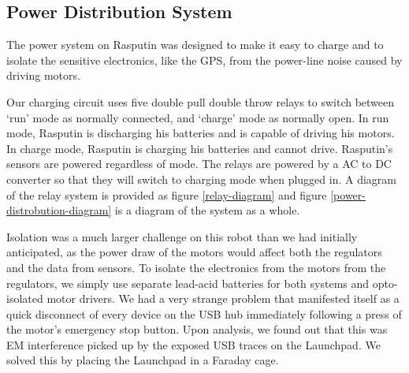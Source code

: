 \documentclass[master.tex]{subfiles}
\begin{document}

\subsection{Power Distribution System}
The power system on Rasputin was designed to make it easy to charge and to isolate the sensitive electronics, like the GPS, from the power-line noise caused by driving motors.

Our charging circuit uses five double pull double throw relays to switch between `run' mode as normally connected, and `charge' mode as normally open.
In run mode, Rasputin is discharging his batteries and is capable of driving his motors.
In charge mode, Rasputin is charging his batteries and cannot drive.
Rasputin's sensors are powered regardless of mode.
The relays are powered by a AC to DC converter so that they will switch to charging mode when plugged in.
A diagram of the relay system is provided as figure \ref{relay-diagram} and figure \ref{power-distrobution-diagram} is a diagram of the system as a whole.


Isolation was a much larger challenge on this robot than we had initially anticipated, as the power draw of the motors would affect both the regulators and the data from sensors.
To isolate the electronics from the motors from the regulators, we simply use separate lead-acid batteries for both systems and opto-isolated motor drivers.
We had a very strange problem that manifested itself as a quick disconnect of every device on the USB hub immediately following a press of the motor's emergency stop button.
Upon analysis, we found out that this was EM interference picked up by the exposed USB traces on the Launchpad.
We solved this by placing the Launchpad in a Faraday cage.
\end{document}
